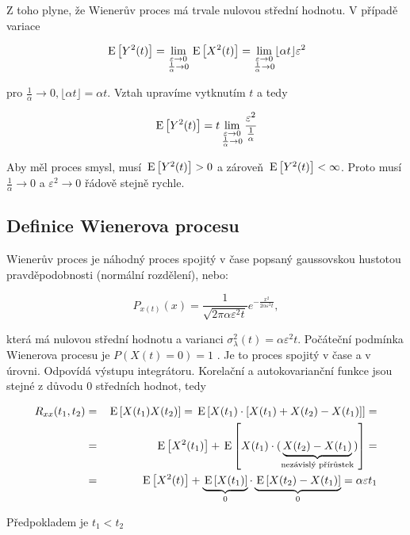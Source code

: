 Z toho plyne, že Wienerův proces má trvale nulovou střední hodnotu. V případě variace

\[ \,\mathrm{E}\left[Y^2(t)\right] = \lim_{\substack{\varepsilon\to 0\\ \frac{1}{\alpha}\to 0}} \,\mathrm{E}\left[X^2(t)\right]=\lim_{\substack{\varepsilon\to 0\\ \frac{1}{\alpha}\to 0}} \lfloor\alpha t\rfloor \varepsilon^2 \]

pro $\frac{1}{\alpha}\to 0, \lfloor\alpha t\rfloor=\alpha t$. Vztah upravíme vytknutím $t$ a tedy

\[ \,\mathrm{E}\left[Y^2(t)\right] = t \lim_{\substack{\varepsilon\to 0\\ \frac{1}{\alpha}\to 0}} \frac{\varepsilon^2}{\frac{1}{\alpha}} \]

Aby měl proces smysl, musí $\,\mathrm{E}\left[Y^2(t)\right]>0$ a zároveň $\,\mathrm{E}\left[Y^2(t)\right]<\infty$. Proto musí $\frac{1}{\alpha}\to 0$ a $\varepsilon^2\to 0$ řádově stejně rychle.

\subsection{Definice Wienerova procesu}
Wienerův proces je náhodný proces spojitý v čase popsaný gaussovskou hustotou pravděpodobnosti (normální rozdělení), nebo:

\[ P_{x(t)}(x)=\frac{1}{\sqrt{2\pi\alpha\varepsilon^2 t}}e^{-\frac{x^2}{2\alpha\varepsilon^2 t}}, \]

která má nulovou střední hodnotu a varianci $\sigma^2_\lambda(t) = \alpha\varepsilon^2 t$. Počáteční podmínka Wienerova procesu je $P(X(t)=0)=1$ . Je to proces spojitý v čase a v úrovni. Odpovídá výstupu integrátoru. Korelační a autokovarianční funkce jsou stejné z důvodu 0 středních hodnot, tedy

\begin{eqnarray*}
R_{xx}(t_1,t_2) &=&\,\mathrm{E}\left[X(t_1)X(t_2)\right] = \,\mathrm{E}\left[X(t_1)\cdot[X(t_1)+X(t_2)-X(t_1)]\right] = \\
& = & \,\mathrm{E}\left[X^2(t_1)\right] + \,\mathrm{E}\left[X(t_1)\cdot(\underbrace{X(t_2)-X(t_1)}_{\text{nezávislý přírůstek}})\right]= \\
& = & \,\mathrm{E}\left[X^2(t)\right]+\underbrace{\,\mathrm{E}\left[X(t_1)\right]}_0\cdot \underbrace{\,\mathrm{E}\left[X(t_2)-X(t_1)\right]}_0 = \alpha\varepsilon t_1
\end{eqnarray*}

Předpokladem je $t_1<t_2$